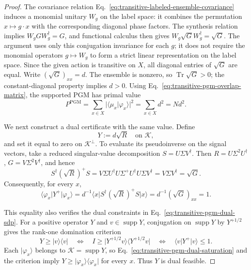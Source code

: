 \documentclass[11pt]{article}
\newcommand{\Tr}{\operatorname{Tr}}
\newcommand{\1}{\mathbf 1}
\newcommand{\supp}{\operatorname{supp}}
\newcommand{\PGM}{\mathrm{PGM}}
\newcommand{\ket}[1]{\lvert #1\rangle}
\newcommand{\bra}[1]{\langle #1\rvert}
\theoremstyle{plain}
\theoremstyle{definition}
\theoremstyle{remark}
\begin{document}
\begin{proof}
The covariance relation
Eq.~\eqref{eq:transitive-labeled-ensemble-covariance} induces a monomial
unitary $W_g$ on the label space: it combines the permutation
$x\mapsto g\cdot x$ with the corresponding diagonal phase factors.  The
synthesis relation implies $W_gGW_g^\dagger=G$, and functional calculus then
gives $W_g\sqrt G W_g^\dagger=\sqrt G$.  The argument uses only this
conjugation invariance for each $g$; it does not require the monomial operators
$g\mapsto W_g$ to form a strict linear representation on the label space.
Since the given action is transitive
on $X$, all diagonal entries of $\sqrt G$ are equal.  Write
$(\sqrt G)_{xx}=d$.  The ensemble is nonzero, so
$\Tr\sqrt G>0$; the constant-diagonal property implies $d>0$.  Using
Eq.~\eqref{eq:transitive-pgm-overlap-matrix}, the supported PGM has primal
value
\begin{equation}
 P^{\PGM}
 =\sum_{x\in X}\lvert\langle\mu_x|\varphi_x\rangle\rvert^2
 =\sum_{x\in X}d^2=Nd^2.
 \label{eq:transitive-pgm-primal-value}
\end{equation}

We next construct a dual certificate with the same value.  Define
\begin{equation}
 Y:=d\sqrt R
 \quad\text{on }\mathcal K,
 \label{eq:transitive-pgm-dual-certificate}
\end{equation}
and set it equal to zero on $\mathcal K^\perp$.  To evaluate its
pseudoinverse on the signal vectors, take a reduced singular-value
decomposition $S=U\Sigma V^\dagger$.  Then
$R=U\Sigma^2U^\dagger$, $G=V\Sigma^2V^\dagger$, and hence
\begin{equation}
 S^\dagger(\sqrt R)^+S
 =V\Sigma U^\dagger U\Sigma^+U^\dagger U\Sigma V^\dagger
 =V\Sigma V^\dagger=\sqrt G.
 \label{eq:transitive-pgm-svd-pseudoinverse-identity}
\end{equation}
Consequently, for every $x$,
\begin{equation}
 \bra{\varphi_x}Y^+\ket{\varphi_x}
 =d^{-1}\bra{x}S^\dagger(\sqrt R)^+S\ket{x}
 =d^{-1}(\sqrt G)_{xx}=1.
 \label{eq:transitive-pgm-dual-saturation}
\end{equation}

This equality also verifies the dual constraints in
Eq.~\eqref{eq:transitive-pgm-dual-sdp}.  For a positive operator $Y$ and
$v\in\supp Y$, conjugation on $\supp Y$ by $Y^{+1/2}$ gives the rank-one
domination criterion
\begin{equation}
 Y\ge\ket{v}\!\bra{v}
 \quad\Longleftrightarrow\quad
 I\ge\ket{Y^{+1/2}v}\!\bra{Y^{+1/2}v}
 \quad\Longleftrightarrow\quad
 \bra{v}Y^+\ket{v}\le1.
 \label{eq:rank-one-pseudoinverse-domination}
\end{equation}
Each $\ket{\varphi_x}$ belongs to $\mathcal K=\supp Y$, so
Eq.~\eqref{eq:transitive-pgm-dual-saturation} and the criterion imply
$Y\ge\ket{\varphi_x}\!\bra{\varphi_x}$ for every $x$.  Thus $Y$ is dual
feasible.


\end{proof}
\end{document}
